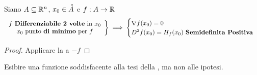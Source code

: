 \begin{proposition}
	Siano $A \subseteq \mathbb{R}^n$, $x_0 \in \accentset{\circ}{A}$ e $f: A \to \mathbb{R}$
	\[
		\left.
			\begin{array}{c}
				f \text{ \textbf{Differenziabile 2 volte} in } x_0\\
				x_0 \text{ punto \textbf{di minimo} per } f
			\end{array}
		\right\}
		\implies
		\begin{cases}
			\nabla f(x_0) = 0\\
			D^2f(x_0) = H_f(x_0) \text{ \textbf{Semidefinita Positiva}}
		\end{cases}
	\]
	\begin{proof}
		Applicare la  a $-f$
	\end{proof}
\end{proposition}
\begin{exercise}
	Esibire una funzione soddisfacente alla tesi della , ma non alle ipotesi.
\end{exercise}

